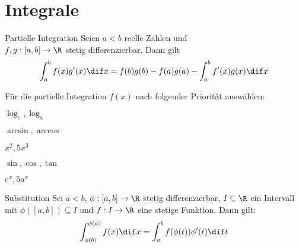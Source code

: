 \section{Integrale}%
\label{sec:integrale}

\begin{theorem}{Partielle Integration}
    Seien $a < b$ reelle Zahlen und\\$f,g:[a,b] \to \R$ stetig differenzierbar. Dann gilt
    \begin{equation*}
        \int_a^b f(x) g'(x) \dif x = f(b) g(b) - f(a) g(a) - \int_a^b f'(x)g(x) \dif x
    \end{equation*}
\end{theorem}
Für die partielle Integration $f(x)$ nach folgender Priorität auswählen:
\begin{enumerate*}
	\item $\log_e, \log_a$
	\item $\arcsin, \arccos$
	\item $x^2, 5x^3$
	\item $\sin, \cos, \tan$
	\item $e^x, 5a^x$
\end{enumerate*}
\begin{theorem}{Substitution}
    Sei $a < b$, $\phi:[a,b] \to \R$ stetig differenzierbar, $I \subseteq \R$ ein Intervall mit $\phi ([a,b]) \subseteq I$ und $f:I \to \R$ eine stetige Funktion. Dann gilt:
    \begin{equation*}
        \int_{\phi (b)}^{\phi (a)} f(x) \dif x = \int_{a}^b f(\phi (t)) \phi'(t) \dif t
    \end{equation*}
\end{theorem}
